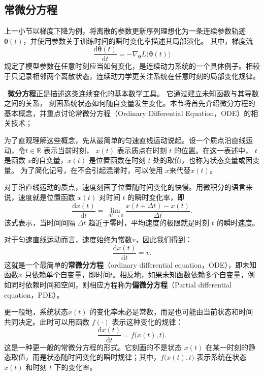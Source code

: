 \documentclass[UTF8,a4paper,zihao=-4,oneside,openany]{ctexbook}
\begin{document}
\subsection{常微分方程}
上一小节以梯度下降为例，将离散的参数更新序列理想化为一条连续参数轨迹
\(\boldsymbol{\theta}(t)\)，并使用参数关于训练时间的瞬时变化率描述其局部演化。
其中，梯度流
\begin{equation}
    \frac{\mathrm{d}\boldsymbol{\theta}(t)}{\mathrm{d}t}
    =
    -
    \nabla_{\boldsymbol{\theta}}
    L\bigl(\boldsymbol{\theta}(t)\bigr)
\end{equation}
规定了模型参数在任意时刻应当如何变化，是连续动力系统的一个具体例子。相较于只记录相邻两个离散状态，连续动力学更关注系统在任意时刻的局部变化规律。

~\textbf{微分方程}正是描述这类连续变化的基本数学工具。
它通过建立未知函数与其导数之间的关系，
刻画系统状态如何随自变量发生变化。本节将首先介绍微分方程的基本概念，并重点讨论常微分方程（Ordinary Differential Equation，ODE）的相关技术；

为了直观理解这些概念，先从最简单的匀速直线运动说起。设一个质点沿直线运动，令\(t \in \mathbb{R}\) 表示当前时刻， \(x(t)\) 表示质点在时刻 \(t\) 的位置。在这一表述中， \(t\) 是函数 \(x\)的自变量，\(x(t)\) 是位置函数在时刻 \(t\) 处的取值，也称为状态变量或因变量。 为了简化记号，在不会引起混淆时，可以使用 \(x\)来代替\(x(t)\)。

对于沿直线运动的质点，速度刻画了位置随时间变化的快慢。用微积分的语言来说，速度就是位置函数 \(x(t)\) 对时间 \(t\) 的瞬时变化率，即
\begin{equation}
\frac{\mathrm{d}x(t)}{\mathrm{d}t}
=
\lim_{\Delta t \to 0}
\frac{x(t+\Delta t)-x(t)}{\Delta t}.
\end{equation}
该式表示，当时间间隔 \(\Delta t\) 趋近于零时，平均速度的极限就是时刻 \(t\) 的瞬时速度。

对于匀速直线运动而言，速度始终为常数\(v\)，因此我们得到：
\begin{equation}
\frac{\mathrm{d}x(t)}{\mathrm{d}t}
=
v.
\label{eq:constant-velocity-ode}
\end{equation}
这就是一个最简单的\textbf{常微分方程}（ordinary differential equation，ODE），即未知函数\(x\) 只依赖单个自变量，即时间\(t\)。相反地，如果未知函数依赖多个自变量，例如同时依赖时间和空间，则相应方程称为\textbf{偏微分方程}（Partial differential equation，PDE）。

更一般地，系统状态\(x(t)\) 的变化率未必是常数，而是也可能由当前状态和时间共同决定。此时可以用函数 \(f(\cdot)\) 表示这种变化的规律：
\begin{equation}
\frac{\mathrm{d}x(t)}{\mathrm{d}t}
=
f\bigl(x(t),t\bigr).
\label{eq:ode-definition}
\end{equation}
这是一种更一般的常微分方程的形式。它刻画的不是状态 \(x(t)\) 在某一时刻的静态取值，而是状态随时间变化的瞬时规律；其中，\(f\bigl(x(t),t\bigr)\) 表示系统在状态 \(x(t)\) 和时刻 \(t\) 下的变化率。
\end{document}
